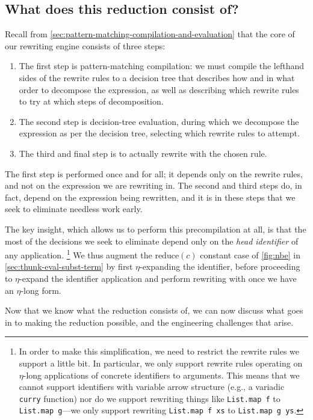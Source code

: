 \subsection{What does this reduction consist of?}\label{sec:rewriting-more:pre-reduction:what-reduction}
Recall from \autoref{sec:pattern-matching-compilation-and-evaluation} that the core of our rewriting engine consists of three steps:
\begin{enumerate}
\item
  The first step is pattern-matching compilation: we must compile the lefthand sides of the rewrite rules to a decision tree that describes how and in what order to decompose the expression, as well as describing which rewrite rules to try at which steps of decomposition.
\item
  The second step is decision-tree evaluation, during which we decompose the expression as per the decision tree, selecting which rewrite rules to attempt.
\item
  The third and final step is to actually rewrite with the chosen rule.
\end{enumerate}
The first step is performed once and for all; it depends only on the rewrite rules, and not on the expression we are rewriting in.
The second and third steps do, in fact, depend on the expression being rewritten, and it is in these steps that we seek to eliminate needless work early.

The key insight, which allows us to perform this precompilation at all, is that the most of the decisions we seek to eliminate depend only on the \emph{head identifier} of any application.%
\footnote{%
  In order to make this simplification, we need to restrict the rewrite rules we support a little bit.
  In particular, we only support rewrite rules operating on $\eta$-long applications of concrete identifiers to arguments.
  This means that we cannot support identifiers with variable arrow structure (e.g., a variadic \texttt{curry} function) nor do we support rewriting things like \texttt{List.map f} to \texttt{List.map g}---we only support rewriting \texttt{List.map f xs} to \texttt{List.map g ys}.%
}
We thus augment the $\text{reduce}(c)$ constant case of \autoref{fig:nbe} in \autoref{sec:thunk-eval-subst-term} by first $\eta$-expanding the identifier, before proceeding to $\eta$-expand the identifier application and perform rewriting with  once we have an $\eta$-long form.

Now that we know what the reduction consists of, we can now discuss what goes in to making the reduction possible, and the engineering challenges that arise.

